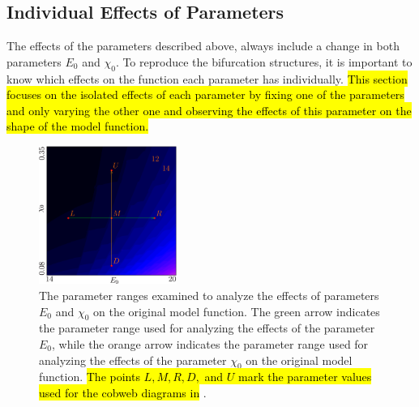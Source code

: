 \subsection{Individual Effects of Parameters}
\label{sec:setup.char.paramfx.individual}

The effects of the parameters described above, always include a change in both parameters $E_0$ and $\chi_0$.
To reproduce the bifurcation structures, it is important to know which effects on the function each parameter has individually.
\hl{
	This section focuses on the isolated effects of each parameter by fixing one of the parameters and only varying the other one and observing the effects of this parameter on the shape of the model function.
}

\begin{figure}
	\centering
	\includegraphics[width=0.4\textwidth]{../Figures/5/5.3/result.png}
	\caption[The parameter ranges examined to analyze the effects of parameters on the original model function]{
		The parameter ranges examined to analyze the effects of parameters $E_0$ and $\chi_0$ on the original model function.
		The green arrow indicates the parameter range used for analyzing the effects of the parameter $E_0$, while the orange arrow indicates the parameter range used for analyzing the effects of the parameter $\chi_0$ on the original model function.
		\hl{The points $L, M, R, D,$ and $U$ mark the parameter values used for the cobweb diagrams in} .
	}
	\label{fig:setup.char.evolution.single.map}
\end{figure}

